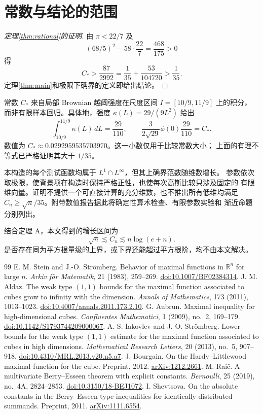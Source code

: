 \documentclass[UTF8,a4paper,11pt,fontset=fandol]{ctexart}
\theoremstyle{remark}
\begin{document}
\section{常数与结论的范围}\label{sec:discussion}
\begin{proof}[定理\ref{thm:rational}的证明]
由 $\pi<22/7$ 及
\[
 (68/5)^2-58\cdot\frac{22}{7}=\frac{468}{175}>0
\]
得
\[
 C_*>\frac{87}{2992}=\frac1{35}+\frac{53}{104720}>\frac1{35}.
\]
定理\ref{thm:main}和极限下确界的定义即给出结论。
\end{proof}

常数 $C_*$ 来自局部 Brownian 越阈强度在尺度区间 $I=[10/9,11/9]$ 上的积分，
而非有限样本回归。具体地，强度 $\kappa(L)=29/(9L^2)$ 给出
\[
 \int_{10/9}^{11/9}\kappa(L)\,dL=\frac{29}{110},\qquad
 \frac{3}{2\sqrt{29}}\phi(0)\frac{29}{110}=C_*.
\]
数值为 $C_*\approx0.0292959535703970$。这一小数仅用于比较常数大小；
上面的有理不等式已严格证明其大于 $1/35$。

本构造的每个测试函数均属于 $L^1\cap L^\infty$，但其上确界范数随维数增长。
参数依次取极限，使背景项在构造时保持严格正性，也使每次高斯比较只涉及固定的
有限维向量。证明不提供一个可直接计算的充分维数，也不推出所有低维均满足
$C_n\ge\sqrt n/35$。附带数值报告据此将确定性算术检查、有限参数实验和
渐近命题分别列出。

结合定理 A，本文得到的增长区间为
\[
 \sqrt n\lesssim C_n\lesssim n\log(e+n).
\]
是否存在同为平方根量级的上界，或下界还能超过平方根阶，均不由本文解决。

\begin{thebibliography}{99}
 E. M. Stein and J.-O. Strömberg.
Behavior of maximal functions in $\mathbb R^n$ for large $n$.
\emph{Arkiv för Matematik}, 21 (1983), 259--269.
\href{https://doi.org/10.1007/BF02384314}{doi:10.1007/BF02384314}.
 J. M. Aldaz.
The weak type $(1,1)$ bounds for the maximal function associated to cubes grow to infinity with the dimension.
\emph{Annals of Mathematics}, 173 (2011), 1013--1023.
\href{https://doi.org/10.4007/annals.2011.173.2.10}{doi:10.4007/annals.2011.173.2.10}.
 G. Aubrun.
Maximal inequality for high-dimensional cubes.
\emph{Confluentes Mathematici}, 1 (2009), no.~2, 169--179.
\href{https://doi.org/10.1142/S1793744209000067}{doi:10.1142/S1793744209000067}.
 A. S. Iakovlev and J.-O. Strömberg.
Lower bounds for the weak type $(1,1)$ estimate for the maximal function associated to cubes in high dimensions.
\emph{Mathematical Research Letters}, 20 (2013), no.~5, 907--918.
\href{https://doi.org/10.4310/MRL.2013.v20.n5.a7}{doi:10.4310/MRL.2013.v20.n5.a7}.
 J. Bourgain.
On the Hardy--Littlewood maximal function for the cube.
Preprint, 2012. \href{https://arxiv.org/abs/1212.2661}{arXiv:1212.2661}.
 M. Raič.
A multivariate Berry--Esseen theorem with explicit constants.
\emph{Bernoulli}, 25 (2019), no.~4A, 2824--2853.
\href{https://doi.org/10.3150/18-BEJ1072}{doi:10.3150/18-BEJ1072}.
 I. Shevtsova.
On the absolute constants in the Berry--Esseen type inequalities for identically distributed summands.
Preprint, 2011. \href{https://arxiv.org/abs/1111.6554}{arXiv:1111.6554}.
\end{thebibliography}
\end{document}
